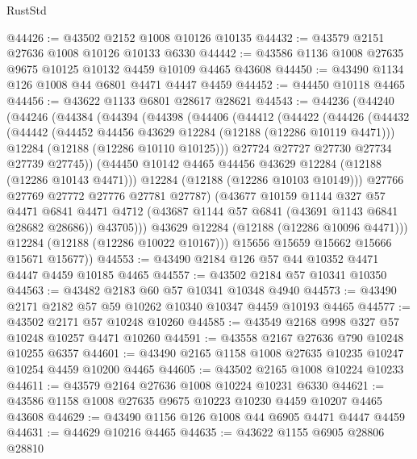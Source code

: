 \begin{lexlean}{RustStd}
\begin{coremodule}
@44426 := @43502 @2152 @1008 @10126 @10135
@44432 := @43579 @2151 @27636 @1008 @10126 @10133 @6330
@44442 := @43586 @1136 @1008 @27635 @9675 @10125 @10132 @4459 @10109 @4465 @43608
@44450 := @43490 @1134 @126 @1008 @44 @6801 @4471 @4447 @4459
@44452 := @44450 @10118 @4465
@44456 := @43622 @1133 @6801 @28617 @28621
@44543 := @44236
    (@44240
      (@44246
        (@44384
          (@44394
            (@44398
              (@44406
                (@44412
                  (@44422
                    (@44426
                      (@44432
                        (@44442
                          (@44452 @44456 @43629 @12284 (@12188 (@12286 @10119 @4471)))
                          @12284
                          (@12188 (@12286 @10110 @10125)))
                        @27724
                        @27727
                        @27730
                        @27734
                        @27739
                        @27745))
                    (@44450 @10142 @4465 @44456 @43629 @12284 (@12188 (@12286 @10143 @4471)))
                    @12284
                    (@12188 (@12286 @10103 @10149)))
                  @27766
                  @27769
                  @27772
                  @27776
                  @27781
                  @27787)
                (@43677
                  @10159
                  @1144
                  @327
                  @57
                  @4471
                  @6841
                  @4471
                  @4712
                  (@43687 @1144 @57 @6841 (@43691 @1143 @6841 @28682 @28686))
                  @43705)))
            @43629
            @12284
            (@12188 (@12286 @10096 @4471)))
          @12284
          (@12188 (@12286 @10022 @10167)))
        @15656
        @15659
        @15662
        @15666
        @15671
        @15677))
@44553 := @43490 @2184 @126 @57 @44 @10352 @4471 @4447 @4459 @10185 @4465
@44557 := @43502 @2184 @57 @10341 @10350
@44563 := @43482 @2183 @60 @57 @10341 @10348 @4940
@44573 := @43490 @2171 @2182 @57 @59 @10262 @10340 @10347 @4459 @10193 @4465
@44577 := @43502 @2171 @57 @10248 @10260
@44585 := @43549 @2168 @998 @327 @57 @10248 @10257 @4471 @10260
@44591 := @43558 @2167 @27636 @790 @10248 @10255 @6357
@44601 := @43490 @2165 @1158 @1008 @27635 @10235 @10247 @10254 @4459 @10200 @4465
@44605 := @43502 @2165 @1008 @10224 @10233
@44611 := @43579 @2164 @27636 @1008 @10224 @10231 @6330
@44621 := @43586 @1158 @1008 @27635 @9675 @10223 @10230 @4459 @10207 @4465 @43608
@44629 := @43490 @1156 @126 @1008 @44 @6905 @4471 @4447 @4459
@44631 := @44629 @10216 @4465
@44635 := @43622 @1155 @6905 @28806 @28810

\end{coremodule}
\end{lexlean}

